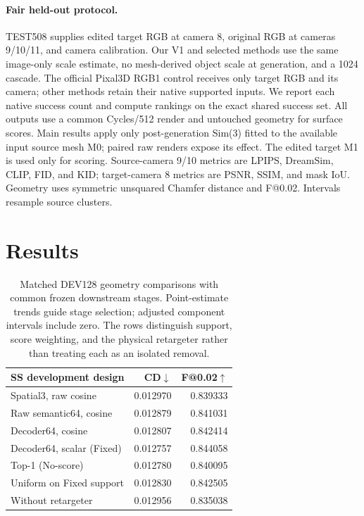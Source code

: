 \documentclass[10pt,twocolumn,letterpaper]{article}
\begin{document}
\paragraph{Fair held-out protocol.}
TEST508 supplies edited target RGB at camera 8, original RGB at cameras
9/10/11, and camera calibration. Our V1 and selected methods use the same
image-only scale estimate, no mesh-derived object scale at generation, and a
1024 cascade. The official Pixal3D RGB1 control receives only target RGB and
its camera; other methods retain their native supported inputs. We report
each native success count and compute rankings on the exact shared success
set. All outputs use a common Cycles/512 render and untouched geometry for
surface scores. Main results apply only post-generation Sim(3) fitted to the
available input source mesh M0; paired raw renders expose its effect. The
edited target M1 is used only for scoring. Source-camera 9/10 metrics are
LPIPS, DreamSim, CLIP, FID, and KID; target-camera 8 metrics are PSNR, SSIM,
and mask IoU. Geometry uses symmetric unsquared Chamfer distance and
F@0.02. Intervals resample source clusters.

\section{Results}
\begin{table}[t]
\centering\footnotesize
\setlength{\tabcolsep}{3pt}
\begin{tabular}{lrr}
\toprule
SS development design & CD$\downarrow$ & F@0.02$\uparrow$\\
\midrule
Spatial3, raw cosine & 0.012970 & 0.839333\\
Raw semantic64, cosine & 0.012879 & 0.841031\\
Decoder64, cosine & 0.012807 & 0.842414\\
Decoder64, scalar (Fixed) & 0.012757 & 0.844058\\
Top-1 (No-score) & 0.012780 & 0.840095\\
Uniform on Fixed support & 0.012830 & 0.842505\\
Without retargeter & 0.012956 & 0.835038\\
\bottomrule
\end{tabular}
\caption{Matched DEV128 geometry comparisons with common frozen downstream
stages. Point-estimate trends guide stage selection; adjusted component
intervals include zero. The rows distinguish support, score weighting, and
the physical retargeter rather than treating each as an isolated removal.}
\label{tab:cvpr-ablation}
\end{table}
\end{document}
